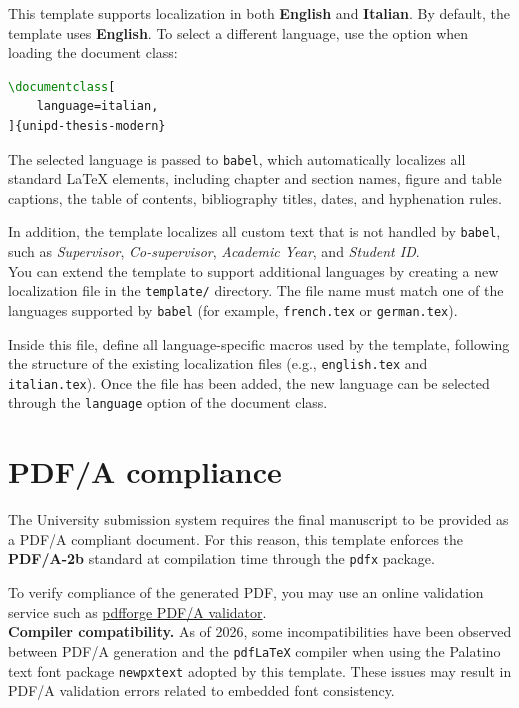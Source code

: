 This template supports localization in both \textbf{English} and \textbf{Italian}. By default, the template uses \textbf{English}.
To select a different language, use the option when loading the document class:

\begin{lstlisting}[language=TeX]
\documentclass[
    language=italian,
]{unipd-thesis-modern}
\end{lstlisting}

The selected language is passed to \texttt{babel}, which automatically localizes all standard \LaTeX{} elements, including chapter and section names, figure and table captions, the table of contents, bibliography titles, dates, and hyphenation rules.

In addition, the template localizes all custom text that is not handled by \texttt{babel}, such as \emph{Supervisor}, \emph{Co-supervisor}, \emph{Academic Year}, and \emph{Student ID}.\\

You can extend the template to support additional languages by creating a new localization file in the \texttt{template/} directory. The file name must match one of the languages supported by \texttt{babel} (for example, \texttt{french.tex} or \texttt{german.tex}).

Inside this file, define all language-specific macros used by the template, following the structure of the existing localization files (e.g., \texttt{english.tex} and \texttt{italian.tex}). Once the file has been added, the new language can be selected through the \texttt{language} option of the document class.




\section{PDF/A compliance}\label{sec:pdfa}

The University submission system requires the final manuscript to be provided as a PDF/A compliant document.
For this reason, this template enforces the \textbf{PDF/A-2b} standard at compilation time through the \verb|pdfx| package.

To verify compliance of the generated PDF, you may use an online validation service such as
\href{https://www.pdfforge.org/online/en/validate-pdfa}{pdfforge PDF/A validator}.\\

\noindent
\textbf{Compiler compatibility.}
As of 2026, some incompatibilities have been observed between PDF/A generation and the \verb|pdfLaTeX| compiler when using the Palatino text font package \verb|newpxtext| adopted by this template.
These issues may result in PDF/A validation errors related to embedded font consistency.


